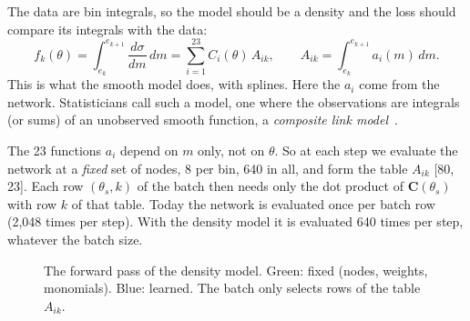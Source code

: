 \documentclass[11pt]{article}
\newcommand{\bC}{\boldsymbol{C}}
\begin{document}
The data are bin integrals, so the model should be a density and the loss should compare its
integrals with the data:
\begin{equation}
  f_k(\theta) = \int_{e_k}^{e_{k+1}} \frac{d\sigma}{dm}\,dm = \sum_{i=1}^{23} C_i(\theta)\,A_{ik},
  \qquad A_{ik} = \int_{e_k}^{e_{k+1}} a_i(m)\,dm .
  \label{eq:binint}
\end{equation}
This is what the smooth model does, with splines. Here the $a_i$ come from the network.
Statisticians call such a model, one where the observations are integrals (or sums) of an
unobserved smooth function, a \emph{composite link model}~\cite{eilers07}.

\begin{keyidea}
The 23 functions $a_i$ depend on $m$ only, not on $\theta$. So at each step we evaluate the
network at a \emph{fixed} set of nodes, 8 per bin, 640 in all, and form the table $A_{ik}$
[80, 23]. Each row $(\theta_s, k)$ of the batch then needs only the dot product of $\bC(\theta_s)$
with row $k$ of that table. Today the network is evaluated once per batch row (2,048 times per
step). With the density model it is evaluated 640 times per step, whatever the batch size.
\end{keyidea}

\begin{figure}[h]
\centering
{}
\caption{The forward pass of the density model. Green: fixed (nodes, weights, monomials). Blue:
learned. The batch only selects rows of the table $A_{ik}$.}
\label{fig:forward}
\end{figure}
\end{document}
